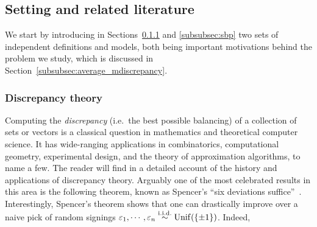 \subsection{Setting and related literature}

We start by introducing in Sections~\ref{subsubsec:discrepancy} and \ref{subsubsec:sbp} two sets of independent definitions and models,
both being important motivations behind the problem we study, which is discussed in Section~\ref{subsubsec:average_mdiscrepancy}.

\subsubsection{Discrepancy theory}\label{subsubsec:discrepancy}

Computing the \emph{discrepancy} (i.e.\ the best possible balancing) of a collection of sets or vectors 
is a classical question in mathematics and theoretical computer science. 
It has wide-ranging applications in combinatorics, computational geometry,
experimental design, and the theory of approximation algorithms, to name a few. 
The reader will find in \cite{spencer1994ten,matousek2009geometric,chen2014panorama} a detailed account of the history and applications of 
discrepancy theory.
Arguably one of the most celebrated results in this area is the following theorem, known as Spencer's ``six deviations suffice''~\citep{spencer1985six}.
\noindent
{}
Interestingly, Spencer's theorem shows that one can drastically improve over a naive pick of random signings $\varepsilon_1, \cdots, \varepsilon_n \overset{\mathrm{i.i.d.}}{\sim} \mathrm{Unif}(\{\pm 1\})$. Indeed, 
